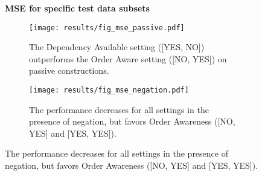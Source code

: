 \begin{figure}[htb!]
	\centering
	\textbf{MSE for specific test data subsets}\par\medskip
	\begin{subfigure}[t]{.5\textwidth}
		\texttt{[image: results/fig\_mse\_passive.pdf]}
		\captionsetup{width=0.9\linewidth}
		\caption{The Dependency Available setting ([YES, NO]) outperforms the Order Aware setting ([NO, YES]) on passive constructions.}
		\label{fig:fig_mse_passive}
	\end{subfigure}%
	\begin{subfigure}[t]{.5\textwidth}
		\texttt{[image: results/fig\_mse\_negation.pdf]}
		\captionsetup{width=0.9\linewidth}
		\caption{The performance decreases for all settings in the presence of negation, but favors Order Awareness ([NO, YES] and [YES, YES]).}
		\label{fig:fig_mse_passive}
	\end{subfigure}	
\end{figure}

